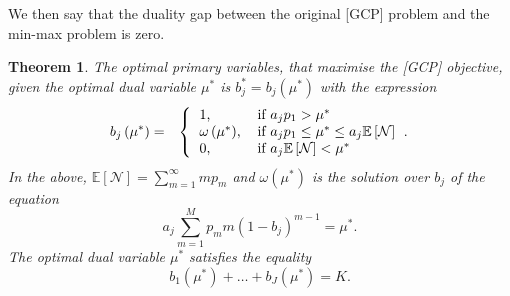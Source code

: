 \documentclass[conference,twocolum,final]{IEEEtran}
\newtheorem{Theorem}{Theorem}
\begin{document}
We then say that the duality gap between the original [GCP] problem and the min-max problem is zero. \begin{Theorem}
\label{Th1}
The optimal primary variables, that maximise the [GCP] objective, given the optimal dual variable $\mu^*$ is $b_j^*=b_j\left(\mu^*\right)$ with the expression
\begin{eqnarray}
\label{SolveSubJJ}
b_j\left(\mu^*\right) & = & \left\{
\begin{tabular}{l l}
$1$, & if $a_j p_1> \mu^*$\\
$\omega\left(\mu^*\right)$, & if $a_j p_1 \leq \mu^* \leq a_j\mathbb{E}\left[\mathcal{N}\right]$\\
$0$, & if $a_j\mathbb{E}\left[\mathcal{N}\right]< \mu^*$ 
\end{tabular}.
\right.
\end{eqnarray}
In the above, $\mathbb{E}\left[\mathcal{N}\right]=\sum_{m=1}^{\infty}m p_m$ and $\omega\left(\mu^*\right)$ is the solution over $b_j$ of the equation
\begin{equation}
\label{Solve2}
a_j\sum_{m=1}^M p_m m (1-b_j)^{m-1}=\mu^*.
\end{equation}
The optimal dual variable $\mu^*$ satisfies the equality
\begin{equation}
\label{Solve3}
b_1\left(\mu^*\right)+\ldots+b_J\left(\mu^*\right)  =  K.
\end{equation}
\end{Theorem}
\end{document}
